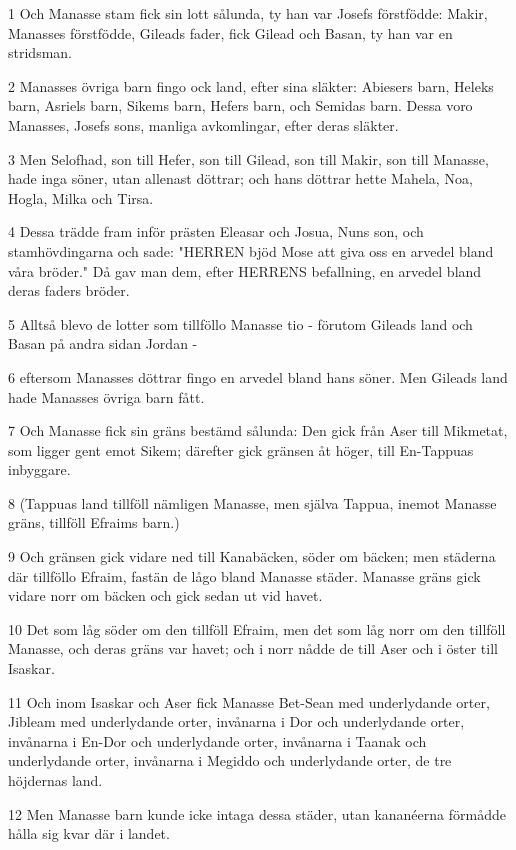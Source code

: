 \par 1 Och Manasse stam fick sin lott sålunda, ty han var Josefs förstfödde: Makir, Manasses förstfödde, Gileads fader, fick Gilead och Basan, ty han var en stridsman.
\par 2 Manasses övriga barn fingo ock land, efter sina släkter: Abiesers barn, Heleks barn, Asriels barn, Sikems barn, Hefers barn, och Semidas barn. Dessa voro Manasses, Josefs sons, manliga avkomlingar, efter deras släkter.
\par 3 Men Selofhad, son till Hefer, son till Gilead, son till Makir, son till Manasse, hade inga söner, utan allenast döttrar; och hans döttrar hette Mahela, Noa, Hogla, Milka och Tirsa.
\par 4 Dessa trädde fram inför prästen Eleasar och Josua, Nuns son, och stamhövdingarna och sade: "HERREN bjöd Mose att giva oss en arvedel bland våra bröder." Då gav man dem, efter HERRENS befallning, en arvedel bland deras faders bröder.
\par 5 Alltså blevo de lotter som tillföllo Manasse tio - förutom Gileads land och Basan på andra sidan Jordan -
\par 6 eftersom Manasses döttrar fingo en arvedel bland hans söner. Men Gileads land hade Manasses övriga barn fått.
\par 7 Och Manasse fick sin gräns bestämd sålunda: Den gick från Aser till Mikmetat, som ligger gent emot Sikem; därefter gick gränsen åt höger, till En-Tappuas inbyggare.
\par 8 (Tappuas land tillföll nämligen Manasse, men själva Tappua, inemot Manasse gräns, tillföll Efraims barn.)
\par 9 Och gränsen gick vidare ned till Kanabäcken, söder om bäcken; men städerna där tillföllo Efraim, fastän de lågo bland Manasse städer. Manasse gräns gick vidare norr om bäcken och gick sedan ut vid havet.
\par 10 Det som låg söder om den tillföll Efraim, men det som låg norr om den tillföll Manasse, och deras gräns var havet; och i norr nådde de till Aser och i öster till Isaskar.
\par 11 Och inom Isaskar och Aser fick Manasse Bet-Sean med underlydande orter, Jibleam med underlydande orter, invånarna i Dor och underlydande orter, invånarna i En-Dor och underlydande orter, invånarna i Taanak och underlydande orter, invånarna i Megiddo och underlydande orter, de tre höjdernas land.
\par 12 Men Manasse barn kunde icke intaga dessa städer, utan kananéerna förmådde hålla sig kvar där i landet.
